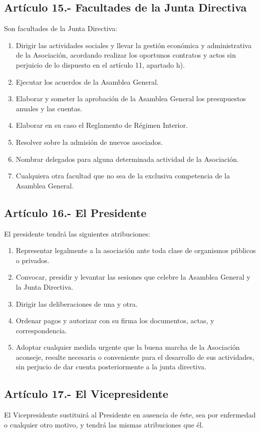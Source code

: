 \documentclass[12pt]{article}
\begin{document}
\subsection{Artículo 15.- Facultades de la Junta Directiva}
Son facultades de la Junta Directiva:
\begin{enumerate}[label=\alph*)]
    \item Dirigir las actividades sociales y llevar la gestión económica y administrativa de la Asociación, acordando realizar los oportunos contratos y actos sin perjuicio de lo dispuesto en el artículo 11, apartado h).
    \item Ejecutar los acuerdos de la Asamblea General.
    \item Elaborar y someter la aprobación de la Asamblea General los presupuestos anuales y las cuentas.
    \item Elaborar en su caso el Reglamento de Régimen Interior.
    \item Resolver sobre la admisión de nuevos asociados.
    \item Nombrar delegados para alguna determinada actividad de la Asociación.
    \item Cualquiera otra facultad que no sea de la exclusiva competencia de la Asamblea General.
\end{enumerate}

\subsection{Artículo 16.- El Presidente}
El presidente tendrá las siguientes atribuciones:
\begin{enumerate}[label=\alph*)]
    \item Representar legalmente a la asociación ante toda clase de organismos públicos o privados.
    \item Convocar, presidir y levantar las sesiones que celebre la Asamblea General y la Junta Directiva.
    \item Dirigir las deliberaciones de una y otra.
    \item Ordenar pagos y autorizar con su firma los documentos, actas, y correspondencia.
    \item Adoptar cualquier medida urgente que la buena marcha de la Asociación aconseje, resulte necesaria o conveniente para el desarrollo de sus actividades, sin perjucio de dar cuenta posteriormente a la junta directiva.
\end{enumerate}

\subsection{Artículo 17.- El Vicepresidente}
El Vicepresidente sustituirá al Presidente en ausencia de éste, sea por enfermedad o cualquier otro motivo, y tendrá las mismas atribuciones que él.
\end{document}
